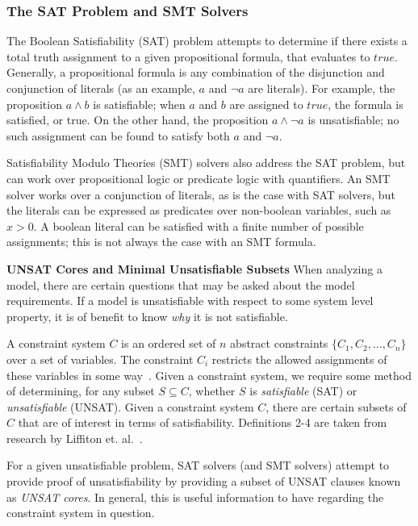 \subsubsection{The SAT Problem and SMT Solvers}
\label{sec:satsmt}
The Boolean Satisfiability (SAT) problem attempts to determine if there exists a total truth assignment to a given propositional formula, that evaluates to $true$. Generally, a propositional formula is any combination of the disjunction and conjunction of literals (as an example, $a$ and $\neg a$ are literals). For example, the proposition $a \land b$ is satisfiable; when $a$ and $b$ are assigned to $true$, the formula is satisfied, or true.  On the other hand, the proposition $a \land \neg a$ is unsatisfiable; no such assignment can be found to satisfy both $a$ and $\neg a$. 

Satisfiability Modulo Theories (SMT) solvers also address the SAT problem, but can work over propositional logic or predicate logic with quantifiers. An SMT solver works over a conjunction of literals, as is the case with SAT solvers, but the literals can be expressed as predicates over non-boolean variables, such as $x > 0$. A boolean literal can be satisfied with a finite number of possible assignments; this is not always the case with an SMT formula.


\textbf{UNSAT Cores and Minimal Unsatisfiable Subsets}
When analyzing a model, there are certain questions that may be asked about the model requirements. If a model is unsatisfiable with respect to some system level property, it is of benefit to know \emph{why} it is not satisfiable. 

A constraint system $C$ is an ordered set of $n$ abstract constraints $\{C_1, C_2, ..., C_n\}$ over a set of variables. The constraint $C_i$ restricts the allowed assignments of these variables in some way~\cite{liffiton2016fast}. Given a constraint system, we require some method of determining, for any subset $S \subseteq C$, whether $S$ is \textit{satisfiable} (SAT) or \textit{unsatisfiable} (UNSAT). Given a constraint system $C$, there are certain subsets of $C$ that are of interest in terms of satisfiability. Definitions 2-4 are taken from research by Liffiton et. al.~\cite{liffiton2016fast}. 

For a given unsatisfiable problem, SAT solvers (and SMT solvers) attempt to provide proof of unsatisfiability by providing a subset of UNSAT clauses known as \textit{UNSAT cores}. In general, this is useful information to have regarding the constraint system in question. 

